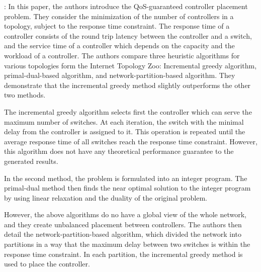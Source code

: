 \documentclass[a4paper,10pt]{article}
\begin{document}





\cite{ChWa15}: In this paper, the authors introduce the QoS-guaranteed controller placement problem. They consider the minimization of the number of controllers in a topology, subject to the response time constraint. The response time of a controller consists of the round trip latency between the controller and a switch, and the service time of a controller which depends on the capacity and the workload of a controller. The authors compare three heuristic algorithms for various topologies form the Internet Topology Zoo: Incremental greedy algorithm, primal-dual-based algorithm, and network-partition-based algorithm. They demonstrate that the incremental greedy method slightly outperforms the other two methods.

The incremental greedy algorithm selects first the controller which can serve the maximum number of switches. At each iteration, the switch with the minimal delay from the controller is assigned to it. This operation is repeated until the average response time of all switches reach the response time constraint. However, this algorithm does not have any theoretical performance guarantee to the generated results. 

In the second method, the problem is formulated into an integer program. The primal-dual method then finds the near optimal solution to the integer program by using linear relaxation and the duality of the original problem. 

However, the above algorithms do no have a global view of the whole network, and they create unbalanced placement between controllers. The authors then detail the network-partition-based algorithm, which divided the network into partitions in a way that the maximum delay between two switches is within the response time constraint. In each partition, the incremental greedy method is used to place the controller.
\end{document}
